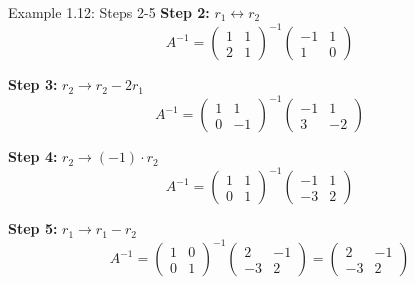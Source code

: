 \documentclass[10pt]{beamer}
\theoremstyle{definition}
\begin{document}
\begin{frame}{Example 1.12: Steps 2-5}
\textbf{Step 2:} $r_1 \leftrightarrow r_2$
$$A^{-1} = \begin{pmatrix} 1 & 1 \\ 2 & 1 \end{pmatrix}^{-1} \begin{pmatrix} -1 & 1 \\ 1 & 0 \end{pmatrix}$$

\textbf{Step 3:} $r_2 \to r_2 - 2r_1$
$$A^{-1} = \begin{pmatrix} 1 & 1 \\ 0 & -1 \end{pmatrix}^{-1} \begin{pmatrix} -1 & 1 \\ 3 & -2 \end{pmatrix}$$

\textbf{Step 4:} $r_2 \to (-1) \cdot r_2$
$$A^{-1} = \begin{pmatrix} 1 & 1 \\ 0 & 1 \end{pmatrix}^{-1} \begin{pmatrix} -1 & 1 \\ -3 & 2 \end{pmatrix}$$

\textbf{Step 5:} $r_1 \to r_1 - r_2$
$$A^{-1} = \begin{pmatrix} 1 & 0 \\ 0 & 1 \end{pmatrix}^{-1} \begin{pmatrix} 2 & -1 \\ -3 & 2 \end{pmatrix} = \begin{pmatrix} 2 & -1 \\ -3 & 2 \end{pmatrix}$$
\end{frame}
\end{document}
